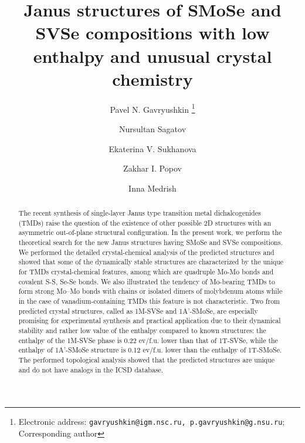 \documentclass[a4paperm]{article}
\begin{document}

\title{Janus structures of SMoSe and SVSe compositions with low enthalpy and unusual crystal chemistry}


\author[1,2,3]{Pavel N. Gavryushkin
   \thanks{Electronic address: \texttt{gavryushkin@igm.nsc.ru, p.gavryushkin@g.nsu.ru}; Corresponding author}}     
\author[2]{Nursultan Sagatov}
\author[1]{Ekaterina V. Sukhanova}
\author[1]{Zakhar I. Popov}
\author[4]{Inna Medrish}



\date{}
\maketitle


\begin{abstract}
The recent synthesis of single-layer Janus type transition metal dichalcogenides (TMDs) raise the question of the existence of other possible 2D structures with an asymmetric out-of-plane structural configuration.
In the present work, we perform the theoretical search for the new Janus structures having SMoSe and SVSe compositions. We performed the detailed crystal-chemical analysis of the predicted structures and showed that some of the dynamically stable structures are characterized by the unique for TMDs crystal-chemical features, among which are quadruple Mo-Mo bonds and covalent S-S, Se-Se bonds. We also illustrated the tendency of Mo-bearing TMDs to form strong Mo--Mo bonds with chains or isolated dimers of molybdenum atoms while in the case of vanadium-containing TMDs this feature is not characteristic. Two from predicted crystal structures, called as 1M-SVSe and 1A'-SMoSe, are especially promising for experimental synthesis and practical application due to their dynamical stability and rather low value of the enthalpy compared to known structures: the enthalpy of the 1M-SVSe phase is 0.22 ev/f.u. lower than that of 1T-SVSe, while the enthalpy of 1A'-SMoSe structure is 0.12 ev/f.u. lower than the enthalpy of 1T-SMoSe. The performed topological analysis showed that the predicted structures are unique and do not have analogs in the ICSD database.
\end{abstract}
\end{document}
